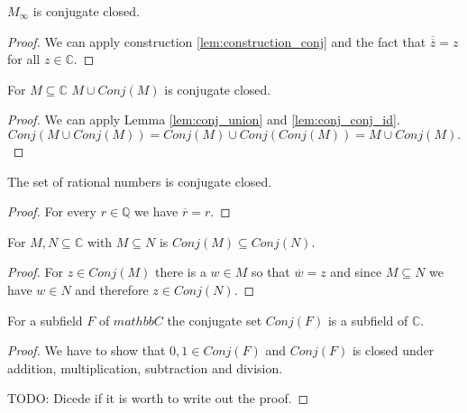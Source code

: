\begin{lemma}
    \label{lem:conj_MField}
    \leanok
    $M_{\infty}$ is conjugate closed.
\end{lemma}
\begin{proof}
    We can apply construction \ref{lem:construction_conj} and the fact that $\overline{\overline z} = z$ for all $z \in\mathbb{C}$.
\end{proof}

\begin{lemma}
    \label{lem:M_con_M}
    \leanok
    For $M\subseteq \mathbb{C}$ $M\cup Conj(M)$ is conjugate closed.
\end{lemma}
\begin{proof}
    We can apply Lemma \ref{lem:conj_union} and \ref{lem:conj_conj_id}.
    $$Conj(M\cup Conj(M)) = Conj(M) \cup Conj(Conj(M)) = M \cup Conj(M).$$
\end{proof}

\begin{lemma}
    \label{lem:ConjClosed.Rat_ConjClosed}
    \leanok
    The set of rational numbers is conjugate closed.
\end{lemma}

\begin{proof}
    For every $r \in \mathbb{Q}$ we have $\overline{r} = r$.
\end{proof}

\begin{lemma}
    \label{lem:ConjClosed.conj_inclusion}
    \leanok
    For $M,N \subseteq \mathbb{C}$ with $M \subseteq N$ is $Conj(M) \subseteq Conj(N)$.
\end{lemma}
\begin{proof}
    For $z \in Conj(M)$ there is a $w \in M$ so that $\overline{w} = z$ and since $M \subseteq N$ we have $w \in N$ and therefore $z \in Conj(N)$.
\end{proof}

\begin{lemma}
    \label{lem:ConjClosed.conj_field}
    \leanok
    For a subfield $F$  of $mathbb{C}$ the conjugate set $Conj(F)$ is a subfield of $\mathbb{C}$.
\end{lemma}
\begin{proof}
    We have to show that $0,1 \in Conj(F)$ and $Conj(F)$ is closed under addition, multiplication, subtraction and division.

    TODO: Dicede if it is worth to write out the proof.
\end{proof}

